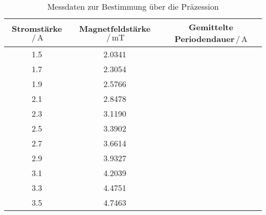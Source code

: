 \begin{table}[h]
    \centering
   
    
    \begin{tabular}{c c c }
      Stromstärke$\,/\,\si{\ampere}$  & Magnetfeldstärke$\,/\,\si{\milli\tesla}$ & Gemittelte Periodendauer$\,/\,\si{\ampere}$ \\
      \toprule
      1.5 & 2.0341 &  \\
      1.7 & 2.3054 &  \\
      1.9 & 2.5766 &  \\
      2.1 & 2.8478 &  \\
      2.3 & 3.1190 &  \\
      2.5 & 3.3902 &  \\
      2.7 & 3.6614 &  \\
      2.9 & 3.9327 &  \\
      3.1 & 4.2039 &  \\
      3.3 & 4.4751 &  \\
      3.5 & 4.7463 &  \\
      \bottomrule
    \end{tabular}
    \caption{Messdaten zur Bestimmung über die Präzession}
    \label{tab:some_data3}
  \end{table}
